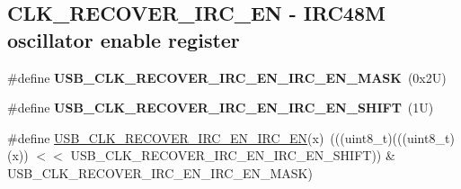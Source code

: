 \subsection*{C\+L\+K\+\_\+\+R\+E\+C\+O\+V\+E\+R\+\_\+\+I\+R\+C\+\_\+\+EN -\/ I\+R\+C48M oscillator enable register}
\begin{DoxyCompactItemize}
\item 
\mbox{\label{group___u_s_b___register___masks_ga0ec64449ae278fc895d80fe9d85882be}} 
\#define {\bfseries U\+S\+B\+\_\+\+C\+L\+K\+\_\+\+R\+E\+C\+O\+V\+E\+R\+\_\+\+I\+R\+C\+\_\+\+E\+N\+\_\+\+I\+R\+C\+\_\+\+E\+N\+\_\+\+M\+A\+SK}~(0x2\+U)
\item 
\mbox{\label{group___u_s_b___register___masks_ga2e1faca39a2e63ef3c4939b39e8b10c0}} 
\#define {\bfseries U\+S\+B\+\_\+\+C\+L\+K\+\_\+\+R\+E\+C\+O\+V\+E\+R\+\_\+\+I\+R\+C\+\_\+\+E\+N\+\_\+\+I\+R\+C\+\_\+\+E\+N\+\_\+\+S\+H\+I\+FT}~(1\+U)
\item 
\#define \mbox{\hyperlink{group___u_s_b___register___masks_gac47a28e4b3e9a5ff688770af8f7d6fc1}{U\+S\+B\+\_\+\+C\+L\+K\+\_\+\+R\+E\+C\+O\+V\+E\+R\+\_\+\+I\+R\+C\+\_\+\+E\+N\+\_\+\+I\+R\+C\+\_\+\+EN}}(x)~(((uint8\+\_\+t)(((uint8\+\_\+t)(x)) $<$$<$ U\+S\+B\+\_\+\+C\+L\+K\+\_\+\+R\+E\+C\+O\+V\+E\+R\+\_\+\+I\+R\+C\+\_\+\+E\+N\+\_\+\+I\+R\+C\+\_\+\+E\+N\+\_\+\+S\+H\+I\+FT)) \& U\+S\+B\+\_\+\+C\+L\+K\+\_\+\+R\+E\+C\+O\+V\+E\+R\+\_\+\+I\+R\+C\+\_\+\+E\+N\+\_\+\+I\+R\+C\+\_\+\+E\+N\+\_\+\+M\+A\+SK)
\end{DoxyCompactItemize}
